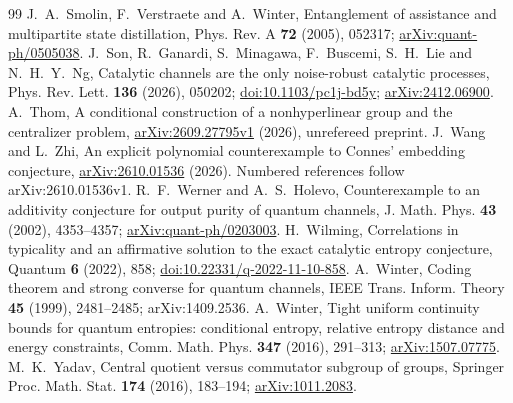 \begin{thebibliography}{99}
 J.~A.~Smolin, F.~Verstraete and A.~Winter, Entanglement of assistance and multipartite state
distillation, Phys. Rev. A \textbf{72} (2005), 052317; \href{https://arxiv.org/abs/quant-ph/0505038}{arXiv:quant-ph/0505038}.
 J.~Son, R.~Ganardi, S.~Minagawa, F.~Buscemi,
S.~H.~Lie and N.~H.~Y.~Ng,
Catalytic channels are the only noise-robust catalytic processes,
Phys. Rev. Lett. \textbf{136} (2026), 050202;
\href{https://doi.org/10.1103/pc1j-bd5y}{doi:10.1103/pc1j-bd5y}; \href{https://arxiv.org/abs/2412.06900}{arXiv:2412.06900}.
 A.~Thom, A conditional construction of a nonhyperlinear
group and the centralizer problem,
\href{https://arxiv.org/abs/2609.27795v1}{arXiv:2609.27795v1} (2026), unrefereed preprint.
 J.~Wang and L.~Zhi, An explicit polynomial counterexample to Connes' embedding conjecture,
\href{https://arxiv.org/abs/2610.01536}{arXiv:2610.01536} (2026). Numbered references follow arXiv:2610.01536v1.
 R.~F.~Werner and A.~S.~Holevo,
Counterexample to an additivity conjecture for output purity of quantum channels,
J. Math. Phys. \textbf{43} (2002), 4353--4357; \href{https://arxiv.org/abs/quant-ph/0203003}{arXiv:quant-ph/0203003}.
 H.~Wilming,
Correlations in typicality and an affirmative solution to the exact catalytic entropy conjecture,
Quantum \textbf{6} (2022), 858;
\href{https://doi.org/10.22331/q-2022-11-10-858}{doi:10.22331/q-2022-11-10-858}.
 A.~Winter, Coding theorem and strong converse for quantum channels, IEEE Trans. Inform. Theory \textbf{45} (1999), 2481--2485;
arXiv:1409.2536.
 A.~Winter, Tight uniform continuity bounds for quantum entropies: conditional entropy, relative entropy distance and energy constraints,
Comm. Math. Phys. \textbf{347} (2016), 291--313; \href{https://arxiv.org/abs/1507.07775}{arXiv:1507.07775}.
 M.~K.~Yadav, Central quotient versus commutator subgroup of groups,
Springer Proc. Math. Stat. \textbf{174} (2016), 183--194;
\href{https://arxiv.org/abs/1011.2083}{arXiv:1011.2083}.
\end{thebibliography}
